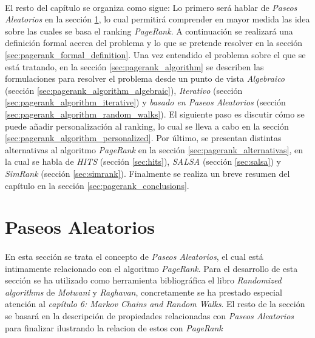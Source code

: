 \documentclass{subfiles}
\begin{document}
      \paragraph{}
      El resto del capítulo se organiza como sigue: Lo primero será hablar de \emph{Paseos Aleatorios} en la sección \ref{sec:random_walks}, lo cual permitirá comprender en mayor medida las idea sobre las cuales se basa el ranking \emph{PageRank}. A continuación se realizará una definición formal acerca del problema y lo que se pretende resolver en la sección \ref{sec:pagerank_formal_definition}. Una vez entendido el problema sobre el que se está tratando, en la sección \ref{sec:pagerank_algorithm} se describen las formulaciones para resolver el problema desde un punto de vista \emph{Algebraico} (sección \ref{sec:pagerank_algorithm_algebraic}), \emph{Iterativo} (sección \ref{sec:pagerank_algorithm_iterative}) y \emph{basado en Paseos Aleatorios} (sección \ref{sec:pagerank_algorithm_random_walks}). El siguiente paso es discutir cómo se puede añadir personalización al ranking, lo cual se lleva a cabo en la sección \ref{sec:pagerank_algorithm_personalized}. Por último, se presentan distintas alternativas al algoritmo \emph{PageRank} en la sección \ref{sec:pagerank_alternativas}, en la cual se habla de \emph{HITS} (sección \ref{sec:hits}), \emph{SALSA} (sección \ref{sec:salsa}) y \emph{SimRank} (sección \ref{sec:simrank}). Finalmente se realiza un breve resumen del capítulo en la sección \ref{sec:pagerank_conclusions}.


    \section{Paseos Aleatorios}
    \label{sec:random_walks}

      \paragraph{}
      En esta sección se trata el concepto de \emph{Paseos Aleatorios}, el cual está intimamente relacionado con el algoritmo \emph{PageRank}. Para el desarrollo de esta sección se ha utilizado como herramienta bibliográfica el libro \emph{Randomized algorithms} \cite{motwani2010randomized} de \emph{Motwani} y \emph{Raghavan}, concretamente se ha prestado especial atención al \emph{capítulo 6: Markov Chains and Random Walks}. El resto de la sección se basará en la descripción de propiedades relacionadas con \emph{Paseos Aleatorios} para finalizar ilustrando la relacion de estos con \emph{PageRank}
\end{document}
